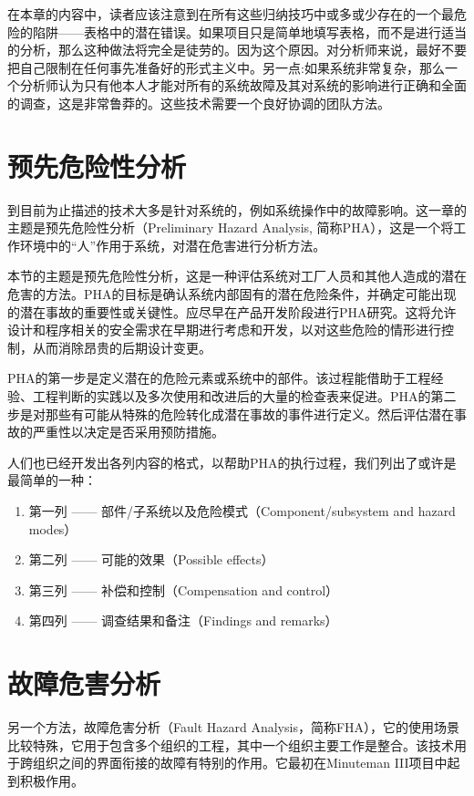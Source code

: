 \documentclass[cn,11pt,chinese]{elegantbook}
\begin{document}
在本章的内容中，读者应该注意到在所有这些归纳技巧中或多或少存在的一个最危险的陷阱——表格中的潜在错误。如果项目只是简单地填写表格，而不是进行适当的分析，那么这种做法将完全是徒劳的。因为这个原因。对分析师来说，最好不要把自己限制在任何事先准备好的形式主义中。另一点:如果系统非常复杂，那么一个分析师认为只有他本人才能对所有的系统故障及其对系统的影响进行正确和全面的调查，这是非常鲁莽的。这些技术需要一个良好协调的团队方法。

\section{预先危险性分析}

到目前为止描述的技术大多是针对系统的，例如系统操作中的故障影响。这一章的主题是预先危险性分析（Preliminary Hazard Analysis, 简称PHA），这是一个将工作环境中的“人”作用于系统，对潜在危害进行分析方法。

本节的主题是预先危险性分析，这是一种评估系统对工厂人员和其他人造成的潜在危害的方法。PHA的目标是确认系统内部固有的潜在危险条件，并确定可能出现的潜在事故的重要性或关键性。应尽早在产品开发阶段进行PHA研究。这将允许设计和程序相关的安全需求在早期进行考虑和开发，以对这些危险的情形进行控制，从而消除昂贵的后期设计变更。

PHA的第一步是定义潜在的危险元素或系统中的部件。该过程能借助于工程经验、工程判断的实践以及多次使用和改进后的大量的检查表来促进。PHA的第二步是对那些有可能从特殊的危险转化成潜在事故的事件进行定义。然后评估潜在事故的严重性以决定是否采用预防措施。

人们也已经开发出各列内容的格式，以帮助PHA的执行过程，我们列出了或许是最简单的一种：

\begin{enumerate}
	\item 第一列 —— 部件/子系统以及危险模式（Component/subsystem and hazard modes）
	\item 第二列 —— 可能的效果（Possible effects）
	\item 第三列 —— 补偿和控制（Compensation and control）
	\item 第四列 —— 调查结果和备注（Findings and remarks）
\end{enumerate}

\section{故障危害分析}

另一个方法，故障危害分析（Fault Hazard Analysis，简称FHA），它的使用场景比较特殊，它用于包含多个组织的工程，其中一个组织主要工作是整合。该技术用于跨组织之间的界面衔接的故障有特别的作用。它最初在Minuteman III项目中起到积极作用。
\end{document}
